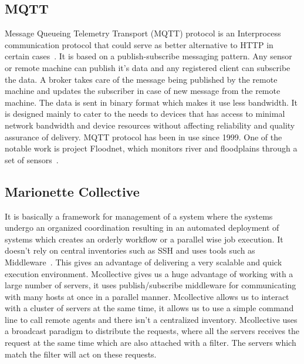 \pv 

\subsection{MQTT}
     
Message Queueing Telemetry Transport (MQTT) protocol is an
Interprocess communication protocol that could serve as better
alternative to HTTP in certain cases~\cite{www-mqtt}. It is based on a
publish-subscribe messaging pattern. Any sensor or remote machine can
publish it's data and any registered client can subscribe the data. A
broker takes care of the message being published by the remote machine
and updates the subscriber in case of new message from the remote
machine. The data is sent in binary format which makes it use less
bandwidth. It is designed mainly to cater to the needs to devices that
has access to minimal network bandwidth and device resources without
affecting reliability and quality assurance of delivery. MQTT protocol
has been in use since 1999. One of the notable work is project
Floodnet, which monitors river and floodplains through a set of
sensors~\cite{www-floodnet}.

     \pv

\subsection{Marionette Collective}

It is basically a framework for management of a system where the
systems undergo an organized coordination resulting in an automated
deployment of systems which creates an orderly workflow or a parallel
wise job execution. It doesn't rely on central inventories such as SSH
and uses tools such as Middleware~\cite{www-marionette-webpage}. This
gives an advantage of delivering a very scalable and quick execution
environment.  Mcollective gives us a huge advantage of working with a
large number of servers, it uses publish/subscribe middleware for
communicating with many hosts at once in a parallel
manner. Mcollective allows us to interact with a cluster of servers at
the same time, it allows us to use a simple command line to call
remote agents and there isn't a centralized inventory. Mcollective
uses a broadcast paradigm to distribute the requests, where all the
servers receives the request at the same time which are also attached
with a filter. The servers which match the filter will act on these
requests.

     \pv
     
